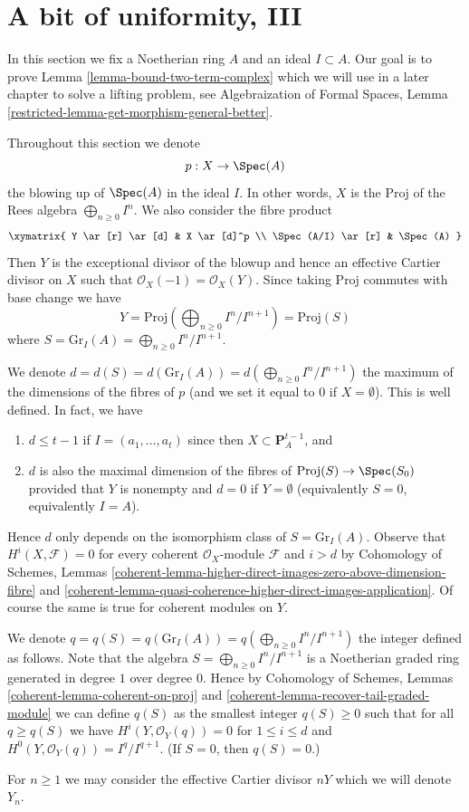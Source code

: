 \section{A bit of uniformity, III}
\label{section-uniform}

\noindent
In this section we fix a Noetherian ring $A$ and an ideal $I \subset A$.
Our goal is to prove Lemma \ref{lemma-bound-two-term-complex} which we will
use in a later chapter to solve a lifting problem, see
Algebraization of Formal Spaces, Lemma
\ref{restricted-lemma-get-morphism-general-better}.

\medskip\noindent
Throughout this section we denote
$$
p : X \to \Spec(A)
$$
the blowing up of $\Spec(A)$ in the ideal $I$. In other words, $X$ is the
$\text{Proj}$ of the Rees algebra $\bigoplus_{n \geq 0} I^n$. We also consider
the fibre product
$$
\xymatrix{
Y \ar[r] \ar[d] & X \ar[d]^p \\
\Spec(A/I) \ar[r] & \Spec(A)
}
$$
Then $Y$ is the exceptional divisor of the blowup and hence
an effective Cartier divisor on $X$ such that
$\mathcal{O}_X(-1) = \mathcal{O}_X(Y)$. Since taking $\text{Proj}$
commutes with base change we have
$$
Y = \text{Proj}(\bigoplus\nolimits_{n \geq 0} I^n/I^{n + 1}) = \text{Proj}(S)
$$
where $S = \text{Gr}_I(A) = \bigoplus_{n \geq 0} I^n/I^{n + 1}$.

\medskip\noindent
We denote
$d = d(S) = d(\text{Gr}_I(A)) = d(\bigoplus_{n \geq 0} I^n/I^{n + 1})$
the maximum of the dimensions of the fibres of $p$
(and we set it equal to $0$ if $X = \emptyset$).
This is well defined. In fact, we have
\begin{enumerate}
\item $d \leq t - 1$ if $I = (a_1, \ldots, a_t)$ since then
$X \subset \mathbf{P}^{t - 1}_A$, and
\item $d$ is also the maximal dimension of the fibres of
$\text{Proj}(S) \to \Spec(S_0)$ provided that $Y$
is nonempty and $d = 0$ if $Y = \emptyset$
(equivalently $S = 0$, equivalently $I = A$).
\end{enumerate}
Hence $d$ only depends on the isomorphism class of $S = \text{Gr}_I(A)$.
Observe that $H^i(X, \mathcal{F}) = 0$ for every coherent
$\mathcal{O}_X$-module $\mathcal{F}$ and $i > d$ by
Cohomology of Schemes, Lemmas
\ref{coherent-lemma-higher-direct-images-zero-above-dimension-fibre} and
\ref{coherent-lemma-quasi-coherence-higher-direct-images-application}.
Of course the same is true for coherent modules on $Y$.

\medskip\noindent
We denote
$q = q(S) = q(\text{Gr}_I(A)) = q(\bigoplus_{n \geq 0} I^n/I^{n + 1})$
the integer defined as follows. Note that the algebra
$S = \bigoplus_{n \geq 0} I^n/I^{n + 1}$
is a Noetherian graded ring generated in degree $1$ over degree $0$.
Hence by
Cohomology of Schemes, Lemmas \ref{coherent-lemma-coherent-on-proj} and
\ref{coherent-lemma-recover-tail-graded-module} we can define $q(S)$
as the smallest integer $q(S) \geq 0$ such that for all $q \geq q(S)$ we have
$H^i(Y, \mathcal{O}_Y(q)) = 0$ for $1 \leq i \leq d$ and
$H^0(Y, \mathcal{O}_Y(q)) = I^q/I^{q + 1}$.
(If $S = 0$, then $q(S) = 0$.)

\medskip\noindent
For $n \geq 1$ we may consider the effective Cartier divisor $nY$
which we will denote $Y_n$.


